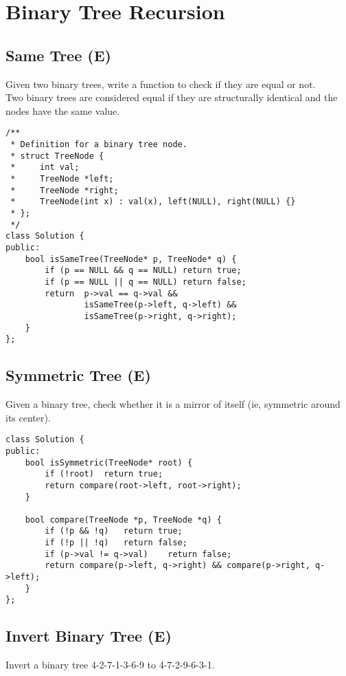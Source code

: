 \section{Binary Tree Recursion}
\subsection{Same Tree (E)}
Given two binary trees, write a function to check if they are equal or not. \\

Two binary trees are considered equal if they are structurally identical and the nodes have the same value. \\

\begin{lstlisting}
/**
 * Definition for a binary tree node.
 * struct TreeNode {
 *     int val;
 *     TreeNode *left;
 *     TreeNode *right;
 *     TreeNode(int x) : val(x), left(NULL), right(NULL) {}
 * };
 */
class Solution {
public:
    bool isSameTree(TreeNode* p, TreeNode* q) {
        if (p == NULL && q == NULL)	return true;
        if (p == NULL || q == NULL)	return false;
        return  p->val == q->val &&
                isSameTree(p->left, q->left) &&
                isSameTree(p->right, q->right);
    }
};
\end{lstlisting}


\subsection{Symmetric Tree (E)}
Given a binary tree, check whether it is a mirror of itself (ie, symmetric around its center).\\

\begin{lstlisting}
class Solution {
public:
    bool isSymmetric(TreeNode* root) {
        if (!root)  return true;
        return compare(root->left, root->right);
    }
    
    bool compare(TreeNode *p, TreeNode *q) {
        if (!p && !q)   return true;
        if (!p || !q)   return false;
        if (p->val != q->val)    return false;
        return compare(p->left, q->right) && compare(p->right, q->left);
    }
};
\end{lstlisting}


\subsection{Invert Binary Tree (E)}
Invert a binary tree 4-2-7-1-3-6-9 to 4-7-2-9-6-3-1. \\

